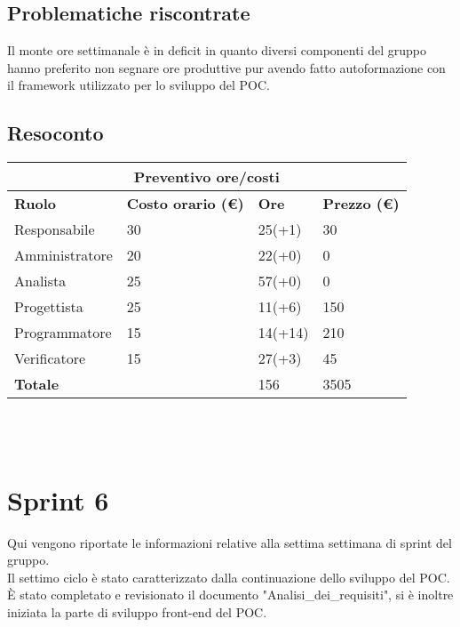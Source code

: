 \documentclass[12pt]{article}
\begin{document}
\subsection{Problematiche riscontrate}
Il monte ore settimanale è in deficit in quanto diversi componenti del gruppo hanno preferito non segnare ore produttive pur avendo fatto autoformazione con il framework utilizzato per lo sviluppo del POC.
\subsection{Resoconto}
\begin{center}
    \begin{tabularx}{\textwidth}{|X|X|X|X|}
        \hline
        \multicolumn{4}{|c|}{\textbf{Preventivo ore/costi}}\\
        \hline
        \hline
        \textbf{Ruolo} & \textbf{Costo orario (\euro)} & \textbf{Ore} & \textbf{Prezzo (\euro)}\\
        \hline
        Responsabile    & 30 & 25(+1)  & 30\\
        \hline
        Amministratore  & 20 & 22(+0)  & 0\\
        \hline
        Analista        & 25 & 57(+0)  & 0\\
        \hline
        Progettista     & 25 & 11(+6)  & 150\\
        \hline
        Programmatore   & 15 & 14(+14)  & 210\\
        \hline
        Verificatore    & 15 & 27(+3)  & 45\\
        \hline
        \hline
        \textbf{Totale} &    & 156 &  3505 \\
        \hline
    \end{tabularx}\\[8pt]
    \mbox{}\\
\end{center}

\section{Sprint 6}
Qui vengono riportate le informazioni relative alla settima settimana di sprint del gruppo. \\
Il settimo ciclo è stato caratterizzato dalla continuazione dello sviluppo del POC. \\
È stato completato e revisionato il documento "Analisi\_dei\_requisiti", si è inoltre iniziata la parte di sviluppo front-end del POC.
\end{document}
